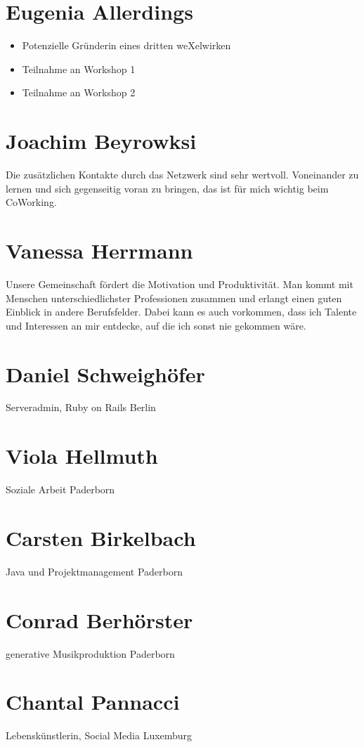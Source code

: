 \begin{appendix}
  \section{Eugenia Allerdings}
\begin{itemize}
\item {Potenzielle Gründerin eines dritten weXelwirken}
\item {Teilnahme an Workshop 1}
\item {Teilnahme an Workshop 2}
\end{itemize}
  \section{Joachim Beyrowksi}
\glqq Die zusätzlichen Kontakte durch das Netzwerk sind sehr wertvoll. Voneinander zu lernen und sich gegenseitig voran zu bringen, das ist für mich wichtig beim CoWorking. \grqq
  \section{Vanessa Herrmann}
\glqq Unsere Gemeinschaft fördert die Motivation und Produktivität. Man kommt mit Menschen unterschiedlichster Professionen zusammen und erlangt einen guten Einblick in andere Berufsfelder. Dabei kann es auch vorkommen, dass ich Talente und Interessen an mir entdecke, auf die ich sonst nie gekommen wäre. \grqq

\section{Daniel Schweighöfer}
Serveradmin, Ruby on Rails
Berlin

\section{Viola Hellmuth}
Soziale Arbeit
Paderborn

\section{Carsten Birkelbach}
Java und Projektmanagement
Paderborn

\section{Conrad Berhörster}
generative Musikproduktion
Paderborn

\section{Chantal Pannacci}
Lebenskünstlerin, Social Media
Luxemburg


\end{appendix}
